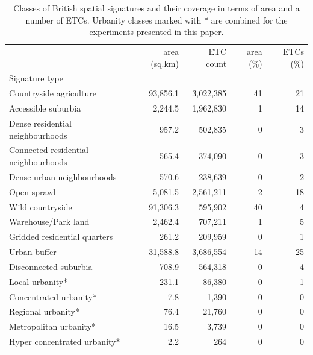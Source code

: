 \begin{table}
\begin{tabular}{lrrrr}
    \toprule
    {} &        area (sq.km) &  ETC count &  area (\%) &
    ETCs (\%) \\
    Signature type                       &             &         &            &
    \\
    \midrule
    Countryside agriculture              & 93,856.1 & 3,022,385 &         41 &
    21 \\
    Accessible suburbia                  &  2,244.5 & 1,962,830 &          1 &
    14 \\
    Dense residential neighbourhoods     &    957.2 &   502,835 &          0 &
    3 \\
    Connected residential neighbourhoods &    565.4 &   374,090 &          0 &
    3 \\
    Dense urban neighbourhoods           &    570.6 &   238,639 &          0 &
    2 \\
    Open sprawl                          &  5,081.5 & 2,561,211 &          2 &
    18 \\
    Wild countryside                     & 91,306.3 &   595,902 &         40 &
    4 \\
    Warehouse/Park land                  &  2,462.4 &   707,211 &          1 &
    5 \\
    Gridded residential quarters         &    261.2 &   209,959 &          0 &
    1 \\
    Urban buffer                         & 31,588.8 & 3,686,554 &         14 &
    25 \\
    Disconnected suburbia                &    708.9 &   564,318 &          0 &
    4 \\
    Local urbanity*                       &    231.1 &    86,380 &          0 &
    1 \\
    Concentrated urbanity*                &      7.8 &     1,390 &          0 &
    0 \\
    Regional urbanity*                    &     76.4 &    21,760 &          0 &
    0 \\
    Metropolitan urbanity*                &     16.5 &     3,739 &          0 &
    0 \\
    Hyper concentrated urbanity*          &      2.2 &       264 &          0 &
    0 \\
    \bottomrule
\end{tabular}
    \caption{\label{tab:sig_types}Classes of British spatial signatures and their
    coverage in terms of area and a number of ETCs. Urbanity classes marked with * are
    combined for the experiments presented in this paper.}
\end{table}


